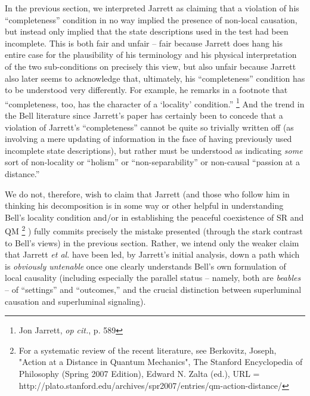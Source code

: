 \documentclass[aps,prc,twocolumn]{revtex4}
\begin{document}
In the previous section, we interpreted Jarrett as claiming that a
violation of his ``completeness'' condition in no way implied the
presence of non-local causation, but instead only implied that the
state descriptions used in the test had been incomplete.  This is both
fair and unfair -- fair because Jarrett does hang his entire case for
the plausibility of his terminology and his physical interpretation of
the two sub-conditions on precisely this view, but also unfair because
Jarrett also later seems to acknowledge that, ultimately, his
``completeness'' condition has to be understood very differently.  For
example, he remarks in a footnote that ``completeness, too, has the
character of a `locality' condition.''  \footnote{Jon Jarrett,
  \emph{op cit.}, p. 589}  And the trend in the Bell
literature since Jarrett's paper has certainly been to concede that a
violation of Jarrett's ``completeness'' cannot be quite so trivially
written off (as involving a mere updating of information in the face
of having previously used incomplete state descriptions), but rather
must be understood as indicating \emph{some} sort of non-locality or
``holism'' or ``non-separability'' or non-causal ``passion at a
distance.''  

We do not, therefore, wish to claim that Jarrett (and those who follow
him in thinking his decomposition is in some way or other helpful in
understanding Bell's locality condition and/or in establishing the
peaceful coexistence of SR and QM  \footnote{For a systematic
  review of the recent literature, see Berkovitz, Joseph, "Action at a
  Distance in Quantum Mechanics", The Stanford Encyclopedia of
  Philosophy (Spring 2007 Edition), Edward N. Zalta (ed.), URL =
  http://plato.stanford.edu/archives/spr2007/entries/qm-action-distance/}
) fully commits precisely the mistake presented (through the stark
contrast to Bell's views) in the previous section.  Rather, we intend
only the weaker claim that Jarrett \emph{et al.} have been led, by
Jarrett's initial analysis, down a path which is \emph{obviously
  untenable} once one clearly understands Bell's own formulation of
local causality (including especially the parallel status -- namely,
both are \emph{beables} -- of ``settings'' and ``outcomes,'' and the 
crucial distinction between superluminal causation and superluminal 
signaling).  
\end{document}
